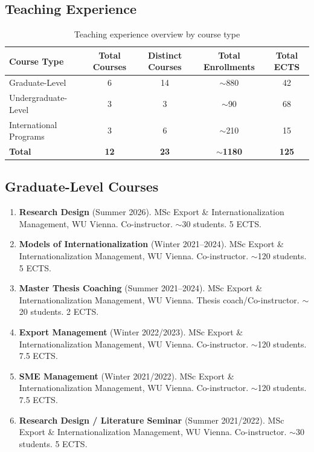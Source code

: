 \documentclass[11pt,a4paper]{article}
\begin{document}
\begin{cv}
\section{Teaching Experience}

\begin{table}[!ht]
\centering
\begin{tabular}{l|c|c|c|c}
\hline
Course Type & Total Courses & Distinct Courses & Total Enrollments & Total ECTS \\ \hline
Graduate-Level & 6 & 14 & $\sim$880 & 42 \\ 
Undergraduate-Level  & 3 & 3 & $\sim$90 & 68 \\ 
International Programs & 3 & 6 & $\sim$210 & 15 \\ \hline
\textbf{Total} & \textbf{12} & \textbf{23} & \textbf{$\sim$1180} & \textbf{125} \\ \hline
\end{tabular}
\caption{Teaching experience overview by course type}
\end{table}

\subsection{Graduate-Level Courses}
\begin{enumerate}
    \item \textbf{Research Design} (Summer 2026). MSc Export \& Internationalization Management, WU Vienna. Co-instructor. $\sim$30 students. 5 ECTS.
    \item \textbf{Models of Internationalization} (Winter 2021--2024). MSc Export \& Internationalization Management, WU Vienna. Co-instructor. $\sim$120 students. 5 ECTS.
    \item \textbf{Master Thesis Coaching} (Summer 2021--2024). MSc Export \& Internationalization Management, WU Vienna. Thesis coach/Co-instructor. $\sim$20 students. 2 ECTS.
    \item \textbf{Export Management} (Winter 2022/2023). MSc Export \& Internationalization Management, WU Vienna. Co-instructor. $\sim$120 students. 7.5 ECTS.
    \item \textbf{SME Management} (Winter 2021/2022). MSc Export \& Internationalization Management, WU Vienna. Co-instructor. $\sim$120 students. 7.5 ECTS.
    \item \textbf{Research Design / Literature Seminar} (Summer 2021/2022). MSc Export \& Internationalization Management, WU Vienna. Co-instructor. $\sim$30 students. 5 ECTS.
\end{enumerate}


\end{cv}
\end{document}
